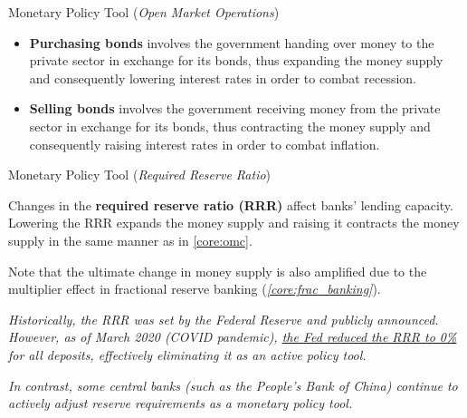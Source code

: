 \documentclass[10pt]{article}
\begin{document}
\begin{core}[label=core:omc]{Monetary Policy Tool (\textit{Open Market Operations})}
      \begin{itemize}

        \item \textbf{Purchasing bonds} involves the government handing over money to the private sector in exchange for its bonds, thus expanding the money supply and consequently lowering interest rates in order to combat recession.

        \item \textbf{Selling bonds} involves the government receiving money from the private sector in exchange for its bonds, thus contracting the money supply and consequently raising interest rates in order to combat inflation.

      \end{itemize}

    \end{core}

    \begin{core}[label=core:rrr]{Monetary Policy Tool (\textit{Required Reserve Ratio})}

      Changes in the \textbf{required reserve ratio (RRR)} affect banks' lending capacity. Lowering the RRR expands the money supply and raising it contracts the money supply in the same manner as in \autoref{core:omc}. 

      Note that the ultimate change in money supply is also amplified due to the multiplier effect in fractional reserve banking (\textit{\autoref{core:frac_banking}}).

      \textit{Historically, the RRR was set by the Federal Reserve and publicly announced. However, as of March 2020 (COVID pandemic), \href{https://www.federalreserve.gov/monetarypolicy/reservereq.htm}{the Fed reduced the RRR to 0\%} for all deposits, effectively eliminating it as an active policy tool.}

      \textit{In contrast, some central banks (such as the People's Bank of China) continue to actively adjust reserve requirements as a monetary policy tool.}

    \end{core}
\end{document}
